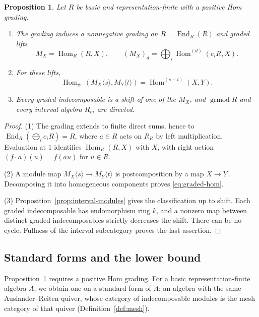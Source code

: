\documentclass[a4paper,reqno,10pt]{amsart}
\newtheorem{proposition}[theorem]{Proposition}
\theoremstyle{definition}
\numberwithin{equation}{section}
\DeclareMathOperator{\Hom}{Hom}
\DeclareMathOperator{\End}{End}
\begin{document}
\begin{proposition}\label{prop:graded-classification}
Let \(R\) be basic and representation-finite with a positive Hom grading.
\begin{enumerate}
\item The grading induces a nonnegative grading on \(R=\End_R(R)\) and
graded lifts
\[
 M_X=\Hom_R(R,X),\qquad
 (M_X)_d=\bigoplus_i\Hom^{(d)}(e_iR,X).
\]
\item For these lifts,
\begin{equation}\label{eq:graded-hom}
 \Hom_{\mathrm{gr}}(M_X\langle s\rangle,M_Y\langle t\rangle)
 =\Hom^{(s-t)}(X,Y).
\end{equation}
\item Every graded indecomposable is a shift of one of the \(M_X\), and
\(\operatorname{grmod}R\) and every interval algebra \(R_m\) are directed.
\end{enumerate}
\end{proposition}
\begin{proof}
(1) The grading extends to finite direct sums, hence to
\(\End_R(\bigoplus_i e_iR)=R\), where \(a\in R\) acts on \(R_R\) by left
multiplication. Evaluation at 1 identifies \(\Hom_R(R,X)\) with \(X\), with
right action \((f\cdot a)(u)=f(au)\) for \(u\in R\).

(2) A module map \(M_X\langle s\rangle\to M_Y\langle t\rangle\) is
postcomposition by a map \(X\to Y\). Decomposing it into homogeneous components
proves \eqref{eq:graded-hom}.

(3) Proposition~\ref{prop:interval-modules}
gives the classification up to shift. Each graded indecomposable has
endomorphism ring \(k\), and a nonzero map between distinct graded
indecomposables strictly decreases the shift. There can be no cycle.
Fullness of the interval subcategory proves the last assertion.
\end{proof}

\subsection{Standard forms and the lower bound}\label{subsec:graded}
Proposition~\ref{prop:graded-classification} requires a positive Hom
grading. For a basic representation-finite algebra \(A\), we obtain one
on a standard form of \(A\): an algebra with the same Auslander--Reiten
quiver, whose category of indecomposable modules is the mesh category of
that quiver (Definition~\ref{def:mesh}).
\end{document}
